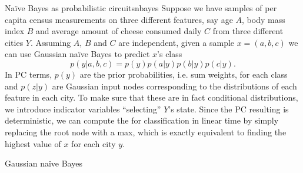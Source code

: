 \begin{example}[sidebyside,lefthand width=0.55\textwidth]{Naïve Bayes as probabilistic circuits}{nbayes}
  Suppose we have samples of per capita census measurements on three different features, say age
  $A$, body mass index $B$ and average amount of cheese consumed daily $C$ from three different
  cities $Y$.  Assuming $A$, $B$ and $C$ are independent, given a sample $x=(a,b,c)$ we can use
  Gaussian naïve Bayes to predict $x$'s class
  \begin{equation}
    p(y|a,b,c)=p(y)p(a|y)p(b|y)p(c|y).
  \end{equation}
  In PC terms, $p(y)$ are the prior probabilities, i.e. sum weights, for each class and $p(z|y)$
  are Gaussian input nodes corresponding to the distributions of each feature in each city. To make
  sure that these are in fact conditional distributions, we introduce indicator variables
  ``selecting'' $Y$'s state. Since the PC resulting is deterministic, we can compute the \map{} for
  classification in linear time by simply replacing the root node with a max, which is exactly
  equivalent to finding the highest value of $x$ for each city $y$.
  \tcblower
  \begin{center}

  \vskip -0.25cm
  \small%
  Gaussian naïve Bayes


\end{center}
\end{example}
